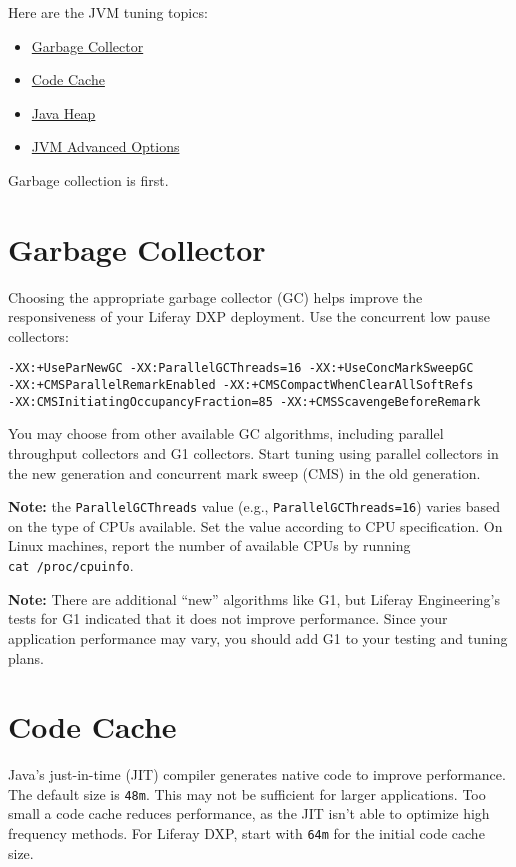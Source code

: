 Here are the JVM tuning topics:

\begin{itemize}
\tightlist
\item
  \hyperref[garbage-collector]{Garbage Collector}
\item
  \hyperref[code-cache]{Code Cache}
\item
  \hyperref[java-heap]{Java Heap}
\item
  \hyperref[jvm-advanced-options]{JVM Advanced Options}
\end{itemize}

Garbage collection is first.

\section{Garbage Collector}\label{garbage-collector}

Choosing the appropriate garbage collector (GC) helps improve the
responsiveness of your Liferay DXP deployment. Use the concurrent low
pause collectors:

\begin{verbatim}
-XX:+UseParNewGC -XX:ParallelGCThreads=16 -XX:+UseConcMarkSweepGC
-XX:+CMSParallelRemarkEnabled -XX:+CMSCompactWhenClearAllSoftRefs
-XX:CMSInitiatingOccupancyFraction=85 -XX:+CMSScavengeBeforeRemark
\end{verbatim}

You may choose from other available GC algorithms, including parallel
throughput collectors and G1 collectors. Start tuning using parallel
collectors in the new generation and concurrent mark sweep (CMS) in the
old generation.

\textbf{Note:} the \texttt{ParallelGCThreads} value (e.g.,
\texttt{ParallelGCThreads=16}) varies based on the type of CPUs
available. Set the value according to CPU specification. On Linux
machines, report the number of available CPUs by running
\texttt{cat\ /proc/cpuinfo}.

\textbf{Note:} There are additional ``new'' algorithms like G1, but
Liferay Engineering's tests for G1 indicated that it does not improve
performance. Since your application performance may vary, you should add
G1 to your testing and tuning plans.

\section{Code Cache}\label{code-cache}

Java's just-in-time (JIT) compiler generates native code to improve
performance. The default size is \texttt{48m}. This may not be
sufficient for larger applications. Too small a code cache reduces
performance, as the JIT isn't able to optimize high frequency methods.
For Liferay DXP, start with \texttt{64m} for the initial code cache
size.

